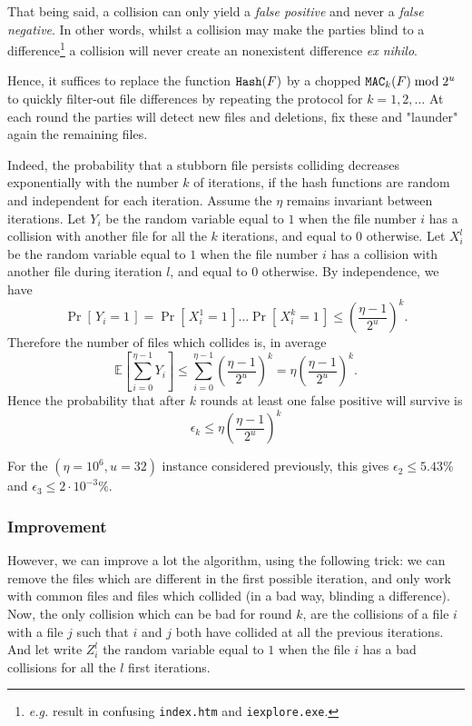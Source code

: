 \documentclass[11pt]{llncs}
\newcommand{\Prob}[1]{{\Pr\left[\,{#1}\,\right]}}
\newcommand{\EE}[1]{{\mathbb{E}\left[{#1}\right]}}
\begin{document}
That being said, a collision can only yield a {\sl false positive} and never a {\sl false negative}. In other words, whilst a collision may make the parties blind to a difference\footnote{{\sl e.g.} result in confusing {\tt index.htm} and {\tt iexplore.exe}.} a collision will never create an nonexistent difference {\sl ex nihilo}.\smallskip

Hence, it suffices to replace the function $\mbox{{\tt Hash}}(F)$ by a chopped $\mbox{{\tt MAC}}_k(F) \bmod 2^u$ to quickly filter-out file differences by repeating the protocol for $k=1,2,\ldots$ At each round the parties will detect new files and deletions, fix these and "launder" again the remaining files.\smallskip

Indeed, the probability that a stubborn file persists colliding decreases exponentially with the number $k$ of iterations, if the hash functions are random and independent for each iteration.
Assume the $\eta$ remains invariant between iterations.
Let $Y_i$ be the random variable equal to $1$ when the file number $i$ has a collision with another file for all the $k$ iterations, and equal to $0$ otherwise.
Let $X^l_i$ be the random variable equal to $1$ when the file number $i$ has a collision with another file during iteration $l$, and equal to $0$ otherwise.
By independence, we have
 \[ \Prob{Y_i = 1} = \Prob{X^1_i = 1} \dots \Prob{X^k_i = 1} \le \left( \frac{\eta -1}{2^u} \right)^k. \] 
Therefore the number of files which collides is, in average
\[
 \EE{\sum_{i=0}^{\eta-1} Y_i} \le \sum_{i=0}^{\eta-1} \left( \frac{\eta -1}{2^u} \right)^k =  \eta \left(\frac{\eta - 1}{2^u}\right)^k.
\]
Hence the probability that after $k$ rounds at least one false positive will survive is
\[
\epsilon_k \le \eta \left(\frac{\eta - 1}{2^u}\right)^k
\]

For the $(\eta=10^6,u=32)$ instance considered previously, this gives $\epsilon_2 \le 5.43\%$ and $\epsilon_3 \le 2 \cdot 10^{-3} \%$.

\subsubsection{Improvement}

However, we can improve a lot the algorithm, using the following trick: we can remove the files which are different in the first possible iteration, and only work with common files and files which collided (in a bad way, blinding a difference).
Now, the only collision which can be bad for round $k$, are the collisions of a file $i$ with a file $j$ such that $i$ and $j$ both have collided at all the previous iterations.
And let write $Z^l_i$ the random variable equal to $1$ when the file $i$ has a bad collisions for all the $l$ first iterations.
\end{document}
